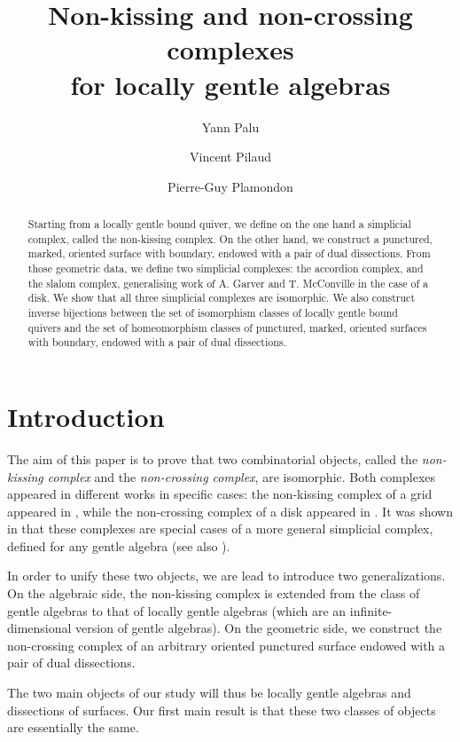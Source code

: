 \documentclass{amsart}
\title[Non-kissing and non-crossing complexes for locally gentle algebras]{Non-kissing and non-crossing complexes \\ for locally gentle algebras}
\author{Yann Palu}
\author{Vincent Pilaud}
\author{Pierre-Guy Plamondon}
\theoremstyle{definition}
\begin{document}
\begin{abstract}
Starting from a locally gentle bound quiver, we define on the one hand a simplicial complex, called the non-kissing complex.
On the other hand, we construct a punctured, marked, oriented surface with boundary, endowed with a pair of dual dissections.
From those geometric data, we define two simplicial complexes: the accordion complex, and the slalom complex, generalising work of A. Garver and T. McConville in the case of a disk.
We show that all three simplicial complexes are isomorphic.
We also construct inverse bijections between the set of isomorphism classes of locally gentle bound quivers and the set of homeomorphism classes of punctured, marked, oriented surfaces with boundary, endowed with a pair of dual dissections.
\end{abstract}


\maketitle

\section{Introduction}

The aim of this paper is to prove that two combinatorial objects, called the \emph{non-kissing complex} and the \emph{non-crossing complex}, are isomorphic.
Both complexes appeared in different works in specific cases: the non-kissing complex of a grid appeared in \cite{McConville}, while the non-crossing complex of a disk appeared in \cite{GarverMcConville}.
It was shown in \cite{PaluPilaudPlamondon} that these complexes are special cases of a more general simplicial complex, defined for any gentle algebra (see also \cite{BrustleDouvilleMousavandThomasYildirim}).

In order to unify these two objects, we are lead to introduce two generalizations.
On the algebraic side, the non-kissing complex is extended from the class of gentle algebras to that of locally gentle algebras (which are an infinite-dimensional version of gentle algebras).
On the geometric side, we construct the non-crossing complex of an arbitrary oriented punctured surface endowed with a pair of dual dissections.

The two main objects of our study will thus be locally gentle algebras and dissections of surfaces.
Our first main result is that these two classes of objects are essentially the same.
\end{document}
